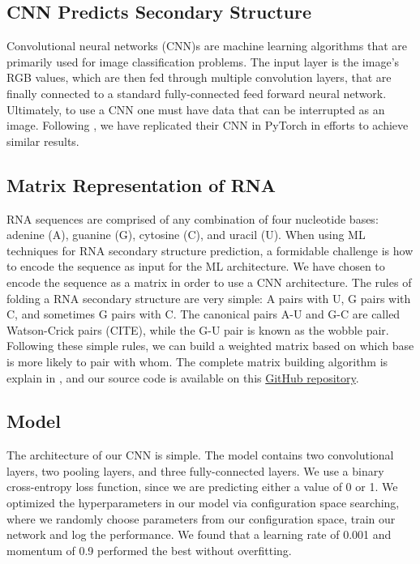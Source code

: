 \documentclass[11pt]{article}
\begin{document}
\begin{multicols}{2}
\section{CNN Predicts Secondary Structure}
Convolutional neural networks (CNN)s are machine learning algorithms that are primarily used for image classification problems. The input layer is the image’s RGB values, which are then fed through multiple convolution layers, that are finally connected to a standard fully-connected feed forward neural network. Ultimately, to use a CNN one must have data that can be interrupted as an image. Following \cite{10.3389/fgene.2019.00467}, we have replicated their CNN in PyTorch \cite{paszke2017automatic} in efforts to achieve similar results.


\subsection{Matrix Representation of RNA}

RNA sequences are comprised of any combination of four nucleotide bases: adenine (A), guanine (G), cytosine (C), and uracil (U). When using ML techniques for RNA secondary structure prediction, a formidable challenge is how to encode the sequence as input for the ML architecture. We have chosen to encode the sequence as a matrix in order to use a CNN architecture. The rules of folding a RNA secondary structure are very simple: A pairs with U, G pairs with C, and sometimes G pairs with C. The canonical pairs A-U and G-C are called Watson-Crick pairs (CITE), while the G-U pair is known as the wobble pair. Following these simple rules, we can build a weighted matrix based on which base is more likely to pair with whom. The complete matrix building algorithm is explain in \cite{10.3389/fgene.2019.00467}, and our source code is available on this \href{https://github.com/harrisonlabollita/RNA-ML/blob/master/src/explore/cnn%20code/rna2matrix.py}{GitHub repository}.

\subsection{Model}

The architecture of our CNN is simple. The  model contains two convolutional layers, two pooling layers, and three fully-connected layers. We use a binary cross-entropy loss function, since we are predicting either a value of 0 or 1. We optimized the hyperparameters in our model via configuration space searching, where we randomly choose parameters from our configuration space, train our network and log the performance. We found that a learning rate of 0.001 and momentum of 0.9 performed the best without overfitting.


\end{multicols}
\end{document}
